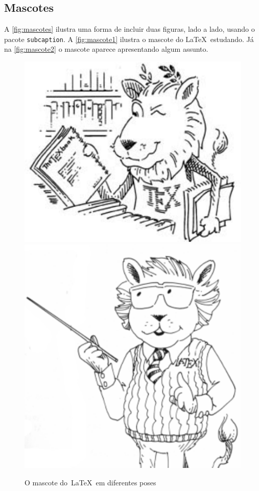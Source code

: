 \subsection{Mascotes}\label{sec:mascotes}


A \autoref{fig:mascotes} ilustra uma forma de incluir duas figuras, lado a lado, usando o pacote \texttt{subcaption}. A \autoref{fig:mascote1} ilustra o mascote do \LaTeX~estudando. Já na \autoref{fig:mascote2} o mascote aparece apresentando algum assunto. 

\begin{figure}[ht]
	\centering
	\caption{O mascote do~\LaTeX~em diferentes poses}\label{fig:mascotes}
		{\includegraphics[width=.4\textwidth]{figuras/lion}}
		{\includegraphics[width=.4\textwidth]{figuras/latex_lion}}
\end{figure}